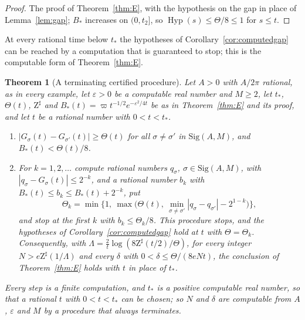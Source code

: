 \documentclass[pdflatex,sn-mathphys-num]{sn-jnl}
\theoremstyle{thmstyleone}%
\newtheorem{theorem}{Theorem}[section]%
\theoremstyle{thmstylethree}%
\newcommand{\Sig}{\mathrm{Sig}}
\newcommand{\Hyp}{\operatorname{Hyp}}
\newcommand{\cZ}{\mathrm{Z}}
\begin{document}
\begin{proof}
The proof of Theorem~\ref{thm:E}, with the hypothesis on the gap in place of Lemma~\ref{lem:gap}; $B_*$ increases on $(0,t_2]$, so $\Hyp(s)\le\Theta/8\le1$ for $s\le t$.
\end{proof}

At every rational time below $t_*$ the hypotheses of Corollary~\ref{cor:computedgap} can be reached by a computation that is guaranteed to stop; this is the computable form of Theorem~\ref{thm:E}.

\begin{theorem}[A terminating certified procedure]\label{thm:computable}
Let $A>0$ with $A/2\pi$ rational, as in every example, let $\varepsilon>0$ be a computable real number and $M\ge2$, let $t_*$, $\Theta(t)$, $\cZ^\sharp$ and $B_*(t)=\varpi t^{-1/2}e^{-\varepsilon^2/4t}$ be as in Theorem~\ref{thm:E} and its proof, and let $t$ be a rational number with $0<t<t_*$.
\begin{enumerate}[label=(\roman*)]
\item $|G_\sigma(t)-G_{\sigma'}(t)|\ge\Theta(t)$ for all $\sigma\ne\sigma'$ in $\Sig(A,M)$, and $B_*(t)<\Theta(t)/8$.
\item For $k=1,2,\dots$ compute rational numbers $q_\sigma$, $\sigma\in\Sig(A,M)$, with $|q_\sigma-G_\sigma(t)|\le2^{-k}$, and a rational number $b_k$ with $B_*(t)\le b_k\le B_*(t)+2^{-k}$, put
\[
  \Theta_k=\min\Big\{1,\ \max\Big(\Theta(t),\ \min_{\sigma\ne\sigma'}|q_\sigma-q_{\sigma'}|-2^{1-k}\Big)\Big\},
\]
and stop at the first $k$ with $b_k\le\Theta_k/8$. This procedure stops, and the hypotheses of Corollary~\ref{cor:computedgap} hold at $t$ with $\Theta=\Theta_k$. Consequently, with $\Lambda=\frac2t\log(8\cZ^\sharp(t/2)/\Theta)$, for every integer $N>e\cZ^\sharp(1/\Lambda)$ and every $\delta$ with $0<\delta\le\Theta/(8eNt)$, the conclusion of Theorem~\ref{thm:E} holds with $t$ in place of $t_*$.
\end{enumerate}
Every step is a finite computation, and $t_*$ is a positive computable real number, so that a rational $t$ with $0<t<t_*$ can be chosen; so $N$ and $\delta$ are computable from $A$, $\varepsilon$ and $M$ by a procedure that always terminates.
\end{theorem}
\end{document}
